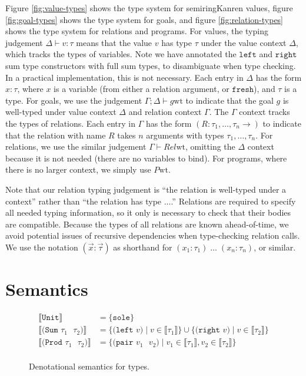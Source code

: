 \documentclass{report}
\theoremstyle{definition}
\newcommand{\den}[1]{\llbracket #1 \rrbracket}
\newcommand{\wt}{\mathrel{\mathrm{wt}}}
\begin{document}
Figure \ref{fig:value-types} shows the type system for semiringKanren values,
figure \ref{fig:goal-types} shows the type system for goals, and figure \ref{fig:relation-types} shows the type system for relations and programs.
For values, the typing judgement \(\Delta \vdash v : \tau\) means that the value \(v\) has type \(\tau\) under the value context \(\Delta\), which tracks the types of variables.
Note we have annotated the \(\texttt{left}\) and \(\texttt{right}\) sum type constructors with full sum types, to disambiguate when type checking.
In a practical implementation, this is not necessary.
Each entry in \(\Delta\) has the form \(x : \tau\), where \(x\) is a variable (from either a relation argument, or \(\texttt{fresh}\)), and \(\tau\) is a type.
For goals, we use the judgement \(\Gamma; \Delta \vdash g \wt\) to indicate that the goal \(g\) is well-typed under value context \(\Delta\) and relation context \(\Gamma\).
The \(\Gamma\) context tracks the types of relations.
Each entry in \(\Gamma\) has the form \((R : \tau_1, \dots, \tau_n \to)\) to indicate that the relation with name \(R\) takes \(n\) arguments with types \(\tau_1, \dots, \tau_n\).
For relations, we use the similar judgement \(\Gamma \vdash Rel \wt\), omitting the \(\Delta\) context because it is not needed (there are no variables to bind).
For programs, where there is no larger context, we simply use \(P \wt\).

Note that our relation typing judgement is ``the relation is well-typed under a context'' rather than ``the relation has type \(\dots\).''
Relations are required to specify all needed typing information, so it only is necessary to check that their bodies are compatible.
Because the types of all relations are known ahead-of-time, we avoid potential issues of recursive dependencies when type-checking relation calls.
We use the notation \((\vec x : \vec\tau)\) as shorthand for \((x_1 : \tau_1) \; \dots \; (x_n : \tau_n)\), or similar.

\section{Semantics}

\begin{figure}
\begin{align*}
	\den{\texttt{Unit}} &= \{\texttt{sole}\} \\
	\den{\texttt{(Sum \(\tau_1\) \(\tau_2\))}} &= \{\texttt{(left \(v\))} \mid v \in \den{\tau_1}\} \cup \{\texttt{(right \(v\))} \mid v \in \den{\tau_2}\} \\
	\den{\texttt{(Prod \(\tau_1\) \(\tau_2\))}} &= \{\texttt{(pair \(v_1\) \(v_2\))} \mid v_1 \in \den{\tau_1}, v_2 \in \den{\tau_2}\} \\
\end{align*}
\caption{Denotational semantics for types.}
\label{fig:types-semantics}
\end{figure}
\end{document}
